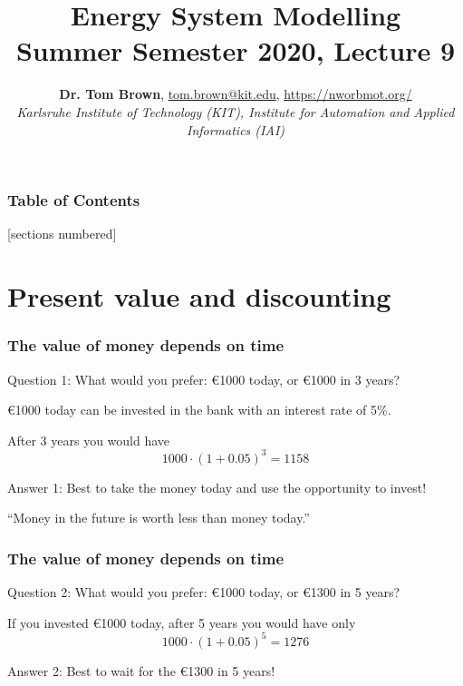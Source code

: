 \documentclass[10pt,aspectratio=169,dvipsnames]{beamer}
\title{Energy System Modelling\\ Summer Semester 2020, Lecture 9}
\author{
  {\bf Dr. Tom Brown}, \href{mailto:tom.brown@kit.edu}{tom.brown@kit.edu}, \url{https://nworbmot.org/}\\
  \emph{Karlsruhe Institute of Technology (KIT), Institute for Automation and Applied Informatics (IAI)}
}
\date{}
\begin{document}
\maketitle


\begin{frame}

  \frametitle{Table of Contents}
  [sections numbered]
  \tableofcontents[hideallsubsections]
\end{frame}


\section{Present value and discounting}


\begin{frame}
  \frametitle{The value of money depends on time}


  \alert{Question 1:} What would you prefer: \euro 1000 today, or \euro 1000 in 3 years?

  \pause

  \euro 1000 today can be invested in the bank with an interest rate of 5\%.

  After 3 years you would have
  \begin{equation*}
     1000 \cdot (1 + 0.05)^3 = 1158
  \end{equation*}

  \alert{Answer 1:} Best to take the money today and use the opportunity to invest!

  \vspace{.5cm}

 ``Money in the future is worth less than money today.''

\end{frame}


\begin{frame}
  \frametitle{The value of money depends on time}


  \alert{Question 2:} What would you prefer: \euro 1000 today, or \euro 1300 in 5  years?

  \pause

  If you invested \euro 1000 today, after 5 years you would have only
  \begin{equation*}
     1000 \cdot (1 + 0.05)^5 = 1276
  \end{equation*}

  \alert{Answer 2:} Best to wait for the \euro 1300 in 5 years!


\end{frame}
\end{document}
